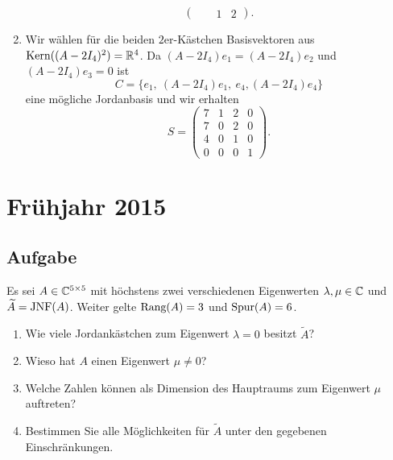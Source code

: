 \begin{enumerate}
\begin{equation*}
\begin{pmatrix}
				 & & 1 & 2 
			\end{pmatrix}\text{.}
		\end{equation*}
	\item Wir wählen für die beiden \( 2 \)er-Kästchen Basisvektoren aus \( \text{Kern}((A-2I_4)^2)=\mathbb{R}^4 \). Da \( (A-2I_4)e_1=(A-2I_4)e_2 \) und \( (A-2I_4)e_3=0 \) ist
	\begin{equation*}
		C = \{ e_1, \ (A-2I_4)e_1, \ e_4, (A-2I_4)e_4 \}
	\end{equation*}
	eine mögliche Jordanbasis und wir erhalten
	\begin{equation*}
		S = \begin{pmatrix}
			7 & 1 & 2 & 0 \\
			7 & 0 & 2 & 0 \\
			4 & 0 & 1 & 0 \\
			0 & 0 & 0 & 1
		\end{pmatrix}\text{.}
	\end{equation*}
\end{enumerate}

\newpage

\section{Frühjahr 2015}

\subsection{Aufgabe}
Es sei \( A \in \mathbb{C}^{5 \times 5} \) mit höchstens zwei verschiedenen Eigenwerten \( \lambda, \mu \in \mathbb{C} \) und \( \widetilde{A}=\text{JNF}(A) \). Weiter gelte \( \text{Rang}(A)=3 \) und \( \text{Spur}(A)=6 \).
\begin{enumerate}
	\item Wie viele Jordankästchen zum Eigenwert \( \lambda = 0 \) besitzt \( \widetilde{A} \)?
	\item Wieso hat \( A \) einen Eigenwert \( \mu \neq 0 \)?
	\item Welche Zahlen können als Dimension des Hauptraums zum Eigenwert \( \mu \) auftreten?
	\item Bestimmen Sie alle Möglichkeiten für \( \widetilde{A} \) unter den gegebenen Einschränkungen. 
\end{enumerate}

